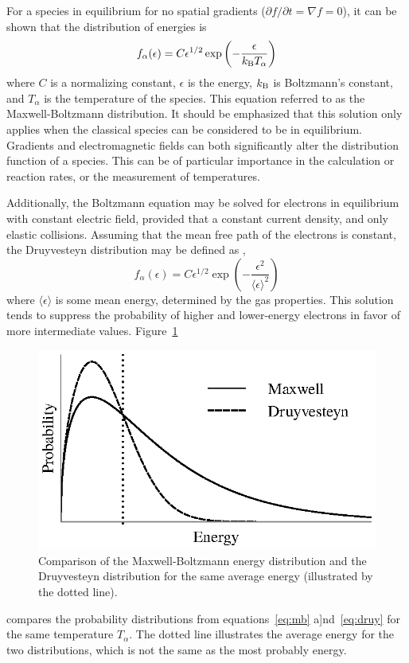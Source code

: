 For a species in equilibrium for no spatial gradients ($\partial f/\partial t =
\nabla f = 0$), it can be shown \cite{Druyvesteyn1940} that the distribution of
energies is
\begin{equation}\label{eq:mb}
  f_\alpha(\epsilon) = C \epsilon^{1/2}
          \exp\left( -\frac{\epsilon}{k_\mathrm{B} T_\alpha}\right)
\end{equation}
where $C$ is a normalizing constant, $\epsilon$ is the energy, $k_\mathrm{B}$ is
Boltzmann's constant, and $T_\alpha$ is the temperature of the species. This
equation referred to as the Maxwell-Boltzmann distribution. It should be
emphasized that this solution only applies when the classical species can be
considered to be in equilibrium. Gradients and electromagnetic fields can both
significantly alter the distribution function of a species. This can be of
particular importance in the calculation or reaction rates, or the measurement
of temperatures.

Additionally, the Boltzmann equation may be solved for electrons in equilibrium
with constant electric field, provided that a constant current density, and only
elastic collisions. Assuming that the mean free path of the electrons is
constant, the Druyvesteyn distribution may be defined as \cite{Druyvesteyn1940},
\begin{equation}
  f_\alpha(\epsilon) = C \epsilon^{1/2}
           \exp\left(-\frac{\epsilon^2}{\langle \epsilon \rangle^2} \right)
  \label{eq:druy}
\end{equation}
where $\langle\epsilon\rangle$ is some mean energy, determined by the gas
properties. This solution tends to suppress the probability of higher and
lower-energy electrons in favor of more intermediate values.
Figure~\ref{fig:simpledists}
\begin{figure}
  \centering
  \includegraphics{./chapters/theory/figures/simpledists.eps}
  \caption{Comparison of the Maxwell-Boltzmann energy distribution and the
    Druyvesteyn distribution for the same average energy (illustrated by the
  dotted line).}
  \label{fig:simpledists}
\end{figure}
compares the probability distributions from equations~\ref{eq:mb}
a]nd~\ref{eq:druy} for the same temperature $T_\alpha$. The dotted line
illustrates the average energy for the two distributions, which is not the same
as the most probably energy.


